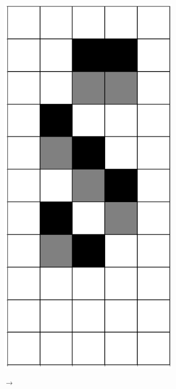 \documentclass[12pt]{article}
\numberwithin{figure}{section} %
\begin{document}
\begin{figure}[H]
\begin{subfigure}{0.3\textwidth}
     		\subcaption{}
   	\end{subfigure}
        \begin{subfigure}{0.3\textwidth}
     		\centering
     		\includegraphics[angle=270,width=\linewidth]{Section4/4.2}
     		\subcaption{}
   	\end{subfigure}
	\begin{subfigure}[t]{0.03\textwidth}
      		{\LARGE$\xrightarrow{}$}
	\end{subfigure}
      	\newline
   	\setcounter{subfigure}{0}


\end{figure}
\end{document}
